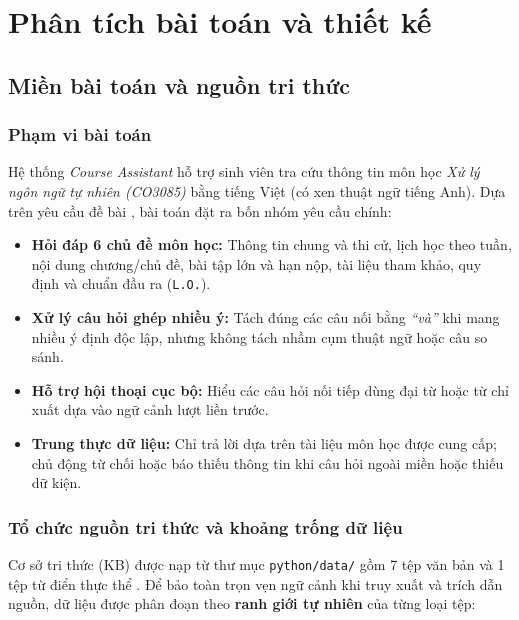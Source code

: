 \chapter{Phân tích bài toán và thiết kế}

\section{Miền bài toán và nguồn tri thức}

\subsection{Phạm vi bài toán}

Hệ thống \emph{Course Assistant} hỗ trợ sinh viên tra cứu thông tin môn học \emph{Xử lý ngôn ngữ tự nhiên (CO3085)} bằng tiếng Việt (có xen thuật ngữ tiếng Anh). Dựa trên yêu cầu đề bài \cite{assignment}, bài toán đặt ra bốn nhóm yêu cầu chính:
\begin{itemize}
  \item \textbf{Hỏi đáp 6 chủ đề môn học:} Thông tin chung và thi cử, lịch học theo tuần, nội dung chương/chủ đề, bài tập lớn và hạn nộp, tài liệu tham khảo, quy định và chuẩn đầu ra (\texttt{L.O.}).
  \item \textbf{Xử lý câu hỏi ghép nhiều ý:} Tách đúng các câu nối bằng \emph{``và''} khi mang nhiều ý định độc lập, nhưng không tách nhầm cụm thuật ngữ hoặc câu so sánh.
  \item \textbf{Hỗ trợ hội thoại cục bộ:} Hiểu các câu hỏi nối tiếp dùng đại từ hoặc từ chỉ xuất dựa vào ngữ cảnh lượt liền trước.
  \item \textbf{Trung thực dữ liệu:} Chỉ trả lời dựa trên tài liệu môn học được cung cấp; chủ động từ chối hoặc báo thiếu thông tin khi câu hỏi ngoài miền hoặc thiếu dữ kiện.
\end{itemize}

\subsection{Tổ chức nguồn tri thức và khoảng trống dữ liệu}

Cơ sở tri thức (KB) được nạp từ thư mục \texttt{python/data/} gồm 7 tệp văn bản và 1 tệp từ điển thực thể \cite{sample-data}. Để bảo toàn trọn vẹn ngữ cảnh khi truy xuất và trích dẫn nguồn, dữ liệu được phân đoạn theo \textbf{ranh giới tự nhiên} của từng loại tệp:

